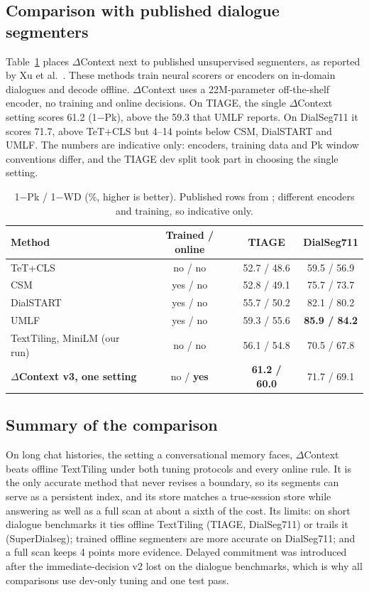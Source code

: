 \documentclass[journal]{IEEEtran}
\newcommand{\dc}{$\Delta$Context}
\begin{document}
\subsection{Comparison with published dialogue segmenters}
\label{sec:published}
Table~\ref{tab:published} places \dc{} next to published unsupervised
segmenters, as reported by Xu et al.\ \cite{xu2025umlf}. These methods train
neural scorers or encoders on in-domain dialogues and decode offline. \dc{}
uses a 22M-parameter off-the-shelf encoder, no training and online decisions.
On TIAGE, the single \dc{} setting scores 61.2 (1$-$Pk), above the 59.3 that
UMLF reports. On DialSeg711 it scores 71.7, above TeT+CLS
\cite{xu2021dialseg711} but 4--14 points below CSM, DialSTART and UMLF. The
numbers are indicative only: encoders, training data and Pk window conventions
differ, and the TIAGE dev split took part in choosing the single setting.

\begin{table}[t]
\centering
\caption{1$-$Pk / 1$-$WD (\%, higher is better). Published rows from \cite{xu2025umlf}; different encoders and training, so indicative only.}
\label{tab:published}
\footnotesize
\setlength{\tabcolsep}{3pt}
\begin{tabular}{@{}lccc@{}}
\toprule
Method & Trained / online & TIAGE & DialSeg711 \\
\midrule
TeT+CLS \cite{xu2021dialseg711} & no / no & 52.7 / 48.6 & 59.5 / 56.9 \\
CSM \cite{xing2021csm} & yes / no & 52.8 / 49.1 & 75.7 / 73.7 \\
DialSTART \cite{gao2023dialstart} & yes / no & 55.7 / 50.2 & 82.1 / 80.2 \\
UMLF \cite{xu2025umlf} & yes / no & 59.3 / 55.6 & \textbf{85.9 / 84.2} \\
\midrule
TextTiling, MiniLM (our run) & no / no & 56.1 / 54.8 & 70.5 / 67.8 \\
\textbf{\dc{} v3, one setting} & no / \textbf{yes} & \textbf{61.2 / 60.0} & 71.7 / 69.1 \\
\bottomrule
\end{tabular}
\end{table}

\subsection{Summary of the comparison}
On long chat histories, the setting a conversational memory faces, \dc{} beats
offline TextTiling under both tuning protocols and every online rule. It is the
only accurate method that never revises a boundary, so its segments can serve
as a persistent index, and its store matches a true-session store while
answering as well as a full scan at about a sixth of the cost. Its limits: on
short dialogue benchmarks it ties offline TextTiling (TIAGE, DialSeg711) or
trails it (SuperDialseg); trained offline segmenters are more accurate on
DialSeg711; and a full scan keeps 4 points more evidence. Delayed commitment
was introduced after the immediate-decision v2 lost on the dialogue
benchmarks, which is why all comparisons use dev-only tuning and one test pass.
\end{document}
